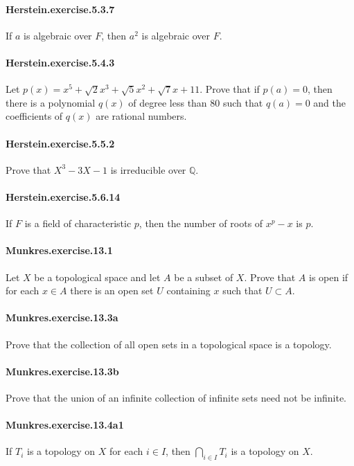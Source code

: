 \documentclass{article}
\begin{document}
\paragraph{Herstein.exercise.5.3.7} If $a$ is algebraic over $F$, then $a^2$ is algebraic over $F$.

\paragraph{Herstein.exercise.5.4.3} Let $p(x) = x^5 + \sqrt{2}x^3 + \sqrt{5}x^2 + \sqrt{7}x + 11$. Prove that if $p(a)=0$, then there is a polynomial $q(x)$ of degree less than 80 such that $q(a)=0$ and the coefficients of $q(x)$ are rational numbers.

\paragraph{Herstein.exercise.5.5.2} Prove that $X^3 - 3X - 1$ is irreducible over $\mathbb{Q}$.

\paragraph{Herstein.exercise.5.6.14} If $F$ is a field of characteristic $p$, then the number of roots of $x^p-x$ is $p$.

\paragraph{Munkres.exercise.13.1} Let $X$ be a topological space and let $A$ be a subset of $X$. Prove that $A$ is open if for each $x\in A$ there is an open set $U$ containing $x$ such that $U\subset A$.

\paragraph{Munkres.exercise.13.3a} Prove that the collection of all open sets in a topological space is a topology.

\paragraph{Munkres.exercise.13.3b} Prove that the union of an infinite collection of infinite sets need not be infinite.

\paragraph{Munkres.exercise.13.4a1} If $T_i$ is a topology on $X$ for each $i\in I$, then $\bigcap_{i\in I} T_i$ is a topology on $X$.
\end{document}
